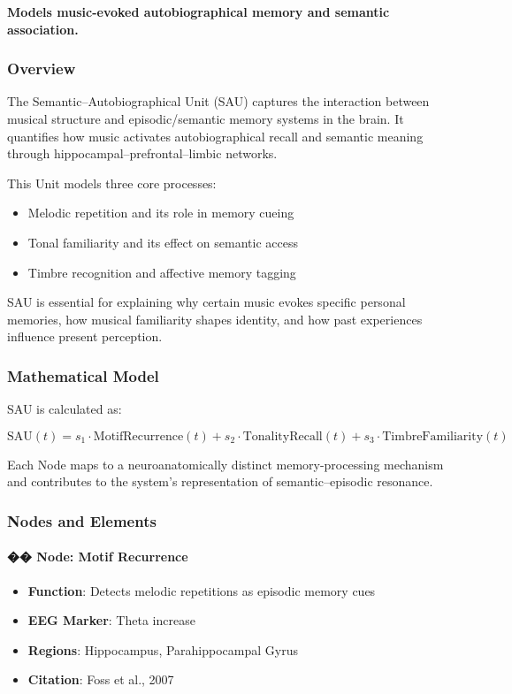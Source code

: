 \documentclass[10pt]{article}
\begin{document}
\textbf{Models music-evoked autobiographical memory and semantic association.}

\subsubsection*{Overview}

The Semantic–Autobiographical Unit (SAU) captures the interaction between musical structure and episodic/semantic memory systems in the brain. It quantifies how music activates autobiographical recall and semantic meaning through hippocampal–prefrontal–limbic networks.

This Unit models three core processes:

\begin{itemize}
    \item Melodic repetition and its role in memory cueing
    \item Tonal familiarity and its effect on semantic access
    \item Timbre recognition and affective memory tagging
\end{itemize}

SAU is essential for explaining why certain music evokes specific personal memories, how musical familiarity shapes identity, and how past experiences influence present perception.

\subsubsection*{Mathematical Model}

SAU is calculated as:

\[
\text{SAU}(t) = s_1 \cdot \text{MotifRecurrence}(t) + s_2 \cdot \text{TonalityRecall}(t) + s_3 \cdot \text{TimbreFamiliarity}(t)
\]

Each Node maps to a neuroanatomically distinct memory-processing mechanism and contributes to the system’s representation of semantic–episodic resonance.

\subsubsection*{Nodes and Elements}

\paragraph{�� Node: Motif Recurrence}

\begin{itemize}
    \item \textbf{Function}: Detects melodic repetitions as episodic memory cues
    \item \textbf{EEG Marker}: Theta increase
    \item \textbf{Regions}: Hippocampus, Parahippocampal Gyrus
    \item \textbf{Citation}: Foss et al., 2007
\end{itemize}
\end{document}
